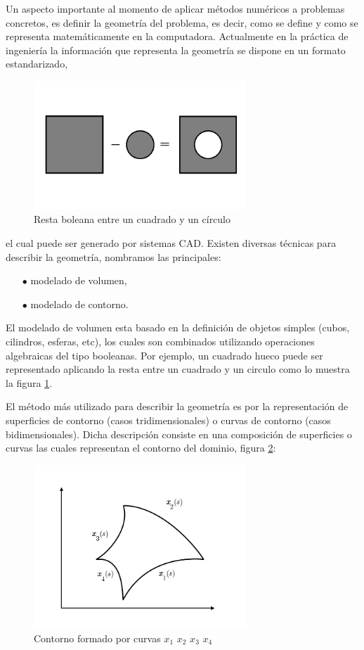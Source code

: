 \documentclass[a4paper,10pt, oneside]{book}
\begin{document}
Un aspecto importante al momento de aplicar métodos numéricos a problemas concretos, es definir la geometría del problema, es decir, como se define y como se representa matemáticamente en la computadora. Actualmente en la práctica de ingeniería la información que representa la geometría se dispone en un formato estandarizado, 
\begin{figure}[b!]
	\centering
	\includegraphics[width=8cm]{Img/3-1}
	\caption{Resta boleana entre un cuadrado y un círculo}
	\label{img:3-1}
\end{figure}
el cual puede ser generado por sistemas CAD. Existen diversas técnicas para describir la geometría, nombramos las principales:
\begin{itemize}
	\item[$\bullet$] modelado de volumen,
	\item[$\bullet$] modelado de contorno.
\end{itemize}

El modelado de volumen esta basado en la definición de objetos simples (cubos, cilindros, esferas, etc), los cuales son combinados utilizando operaciones algebraicas del tipo booleanas. Por ejemplo, un cuadrado hueco puede ser representado aplicando la resta entre un cuadrado y un circulo como lo muestra la figura \ref{img:3-1}.

El método más utilizado para describir la geometría es por la representación de superficies de contorno (casos tridimensionales) o curvas de contorno (casos bidimensionales). Dicha descripción consiste en una composición de superficies o curvas las cuales representan el contorno del dominio, figura \ref{img:3-2}:
\begin{figure}[h!]
	\centering
	\includegraphics[width=8cm]{Img/3-2}
	\caption{Contorno formado por curvas $x_1$ $x_2$ $x_3$ $x_4$}
	\label{img:3-2}
\end{figure}
\end{document}
